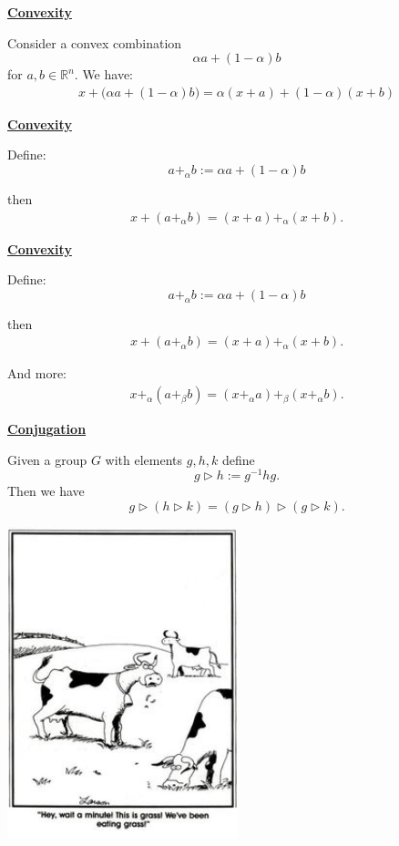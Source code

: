 \documentclass[11pt]{article}
\def\heading #1{\centerline{\underline{\bf\LARGE #1}}}
\def\vsp {\vskip 0.5cm}
\def\R{\mathbb R}
\def\tr{\triangleright}
\begin{document}
\newpage %

\heading{Convexity}
\vsp

Consider a convex combination 
$$ \alpha a + (1-\alpha) b$$ 
for $a,b\in\R^n.$
We have:
\begin{align*}
    x + \bigl( \alpha a + (1-\alpha) b \bigr) = \alpha (x + a) + (1-\alpha) (x + b)
\end{align*}

\newpage %

\heading{Convexity}
\vsp

Define:
$$
    a+_\alpha b := \alpha a + (1-\alpha) b
$$

then
\begin{align*}
    x + ( a +_\alpha b ) = (x+a) +_\alpha (x+b).
\end{align*}

\newpage %

\heading{Convexity}
\vsp

Define:
$$
    a+_\alpha b := \alpha a + (1-\alpha) b
$$

then
\begin{align*}
    x + ( a +_\alpha b ) = (x+a) +_\alpha (x+b).
\end{align*}

And more:
\begin{align*}
    x +_\alpha ( a +_\beta b ) = (x+_\alpha a) +_\beta (x+_\alpha b).
\end{align*}


\newpage %

\heading{Conjugation}
\vsp

Given a group $G$
with elements $g, h, k$
define 
$$g\tr h := g^{-1} h g.$$
Then we have
$$
g \triangleright (h \triangleright k) = (g\triangleright h)\triangleright(g\triangleright k).
$$

\newpage %

\centerline{\includegraphics[width=0.5\textwidth]{Larson.jpg}}
\end{document}

